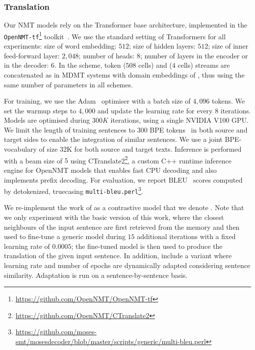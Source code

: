 \subsubsection*{Translation}
Our NMT models rely on the Transformer base architecture, implemented in the \texttt{OpenNMT-tf}\footnote{\url{https://github.com/OpenNMT/OpenNMT-tf}} toolkit~\citep{Klein17opennmt}.
%
We use the standard setting of Transformers for all experiments: size of word embedding: $512$; size of hidden layers: $512$; size of inner feed-forward layer: $2,048$; number of heads: $8$; number of layers in the encoder or in the decoder: $6$. In the  scheme, 
token ($508$ cells) and  ($4$ cells) streams are concatenated as in MDMT systems with domain embeddings of \citet{Kobus17domain}, thus using the same number of parameters in all schemes.

For training, we use the Adam~\citep{Kingma15adam} optimiser with a batch size of $4,096$ tokens. We set the warmup steps to $4,000$ and update the learning rate for every $8$ iterations. Models are optimised during $300K$ iterations, using a single NVIDIA V100 GPU.
%
We limit the length of training sentences to $300$ BPE tokens~\citep{Sennrich16neural} in both source and target sides to enable the integration of similar sentences. We use a joint BPE-vocabulary of size 32K for both source and target texts. Inference is performed with a beam size of $5$ using CTranslate2\footnote{\url{https://github.com/OpenNMT/CTranslate2}}, a custom C++ runtime inference engine for OpenNMT models that enables fast CPU decoding and also implements prefix decoding.
For evaluation, we report BLEU~\citep{Papineni02bleu} scores computed by detokenized, truecasing \texttt{multi-bleu.perl}\footnote{\url{https://github.com/moses-smt/mosesdecoder/blob/master/scripts/generic/multi-bleu.perl}}.

We re-implement the work of \citet{Farajian17multidomain} as a contrastive model that we denote . Note that we only experiment with the basic version of this work, where the closest neighbours of the input sentence are first retrieved from the memory and then used to fine-tune a generic model during $15$ additional iterations with a fixed learning rate of $0.0005$; the fine-tuned model is then used to produce the translation of the given input sentence. In addition, \citet{Farajian17multidomain} include a variant where learning rate and number of epochs are dynamically adapted considering sentence similarity.
Adaptation is run on a sentence-by-sentence basis.

